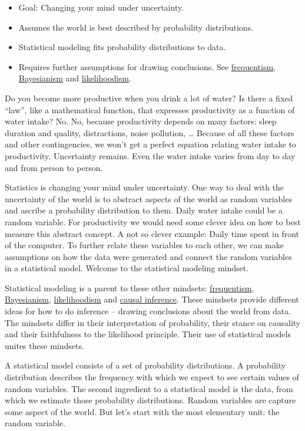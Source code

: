 \documentclass[
  10pt,
]{scrbook}
\providecommand{\tightlist}{%
  \setlength{\itemsep}{0pt}\setlength{\parskip}{0pt}}
\begin{document}
\begin{itemize}
\tightlist
\item
  Goal: Changing your mind under uncertainty.
\item
  Assumes the world is best described by probability distributions.
\item
  Statistical modeling fits probability distributions to data.
\item
  Requires further assumptions for drawing conclusions. See \protect\hyperlink{frequentism}{frequentism}, \protect\hyperlink{bayesian}{Bayesianism} and \protect\hyperlink{likelihoodism}{likelihoodism}.
\end{itemize}

Do you become more productive when you drink a lot of water?
Is there a fixed ``law'', like a mathematical function, that expresses productivity as a function of water intake?
No.
No, because productivity depends on many factors: sleep duration and quality, distractions, noise pollution, \ldots{}
Because of all these factors and other contingencies, we won't get a perfect equation relating water intake to productivity.
Uncertainty remains.
Even the water intake varies from day to day and from person to person.

Statistics is changing your mind under uncertainty.
One way to deal with the uncertainty of the world is to abstract aspects of the world as random variables and ascribe a probability distribution to them.
Daily water intake could be a random variable.
For productivity we would need some clever idea on how to best measure this abstract concept.
A not so clever example: Daily time spent in front of the computer.
To further relate these variables to each other, we can make assumptions on how the data were generated and connect the random variables in a statistical model.
Welcome to the statistical modeling mindset.

Statistical modeling is a parent to these other mindsets: \protect\hyperlink{frequentism}{frequentism}, \protect\hyperlink{bayesianism}{Bayesianism}, \protect\hyperlink{likelihoodism}{likelihoodism} and \protect\hyperlink{causality}{causal inference}.
These mindsets provide different ideas for how to do inference -- drawing conclusions about the world from data.
The mindsets differ in their interpretation of probability, their stance on causality and their faithfulness to the likelihood principle.
Their use of statistical models unites these mindsets.

A statistical model consists of a set of probability distributions.
A probability distribution describes the frequency with which we expect to see certain values of random variables.
The second ingredient to a statistical model is the data, from which we estimate those probability distributions.
Random variables are capture some aspect of the world.
But let's start with the most elementary unit: the random variable.
\end{document}
